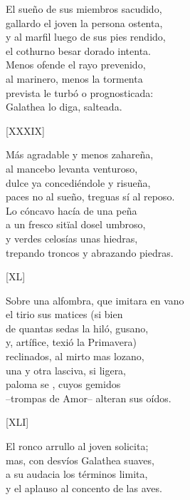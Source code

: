 \documentclass[11pt,a4paper,twoside]{article}
\begin{document}
El sueño de sus miembros sacudido,\\
gallardo el joven la persona ostenta,\\
y al marfil luego de sus pies rendido,\\
el cothurno besar dorado intenta.\\
Menos ofende el rayo prevenido,\\
al marinero, menos la tormenta\\
prevista le turbó o prognosticada:\\
Galathea lo diga, salteada.\par\pend 
%
\begin{center}
	[XXXIX]
\end{center}\pstart
Más agradable y menos zahareña,\\
al mancebo levanta venturoso,\\
dulce ya concediéndole y risueña,\\
paces no al sueño, treguas sí al reposo.\\
Lo cóncavo hacía de una peña\\
a un fresco sitïal dosel umbroso,\\
y verdes celosías unas hiedras,\\
trepando troncos y abrazando piedras.\par\pend
%
\begin{center}
	[XL]
\end{center}\pstart
Sobre una alfombra, que imitara en vano\\
el tirio sus matices (si bien \\
de quantas sedas la hiló, gusano,\\
y, artífice, texió la Primavera)\\
reclinados, al mirto mas lozano,\\
una y otra lasciva, si ligera,\\
paloma se , cuyos gemidos\\
--trompas de Amor-- alteran sus oídos.\par\pend
%
\begin{center}
	[XLI]
\end{center}\pstart
El ronco arrullo al joven solicita;\\
mas, con desvíos Galathea suaves,\\
a su audacia los términos limita,\\
y el aplauso al concento de las aves.\\
\end{document}
